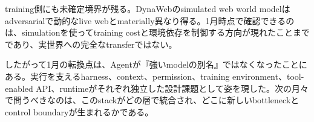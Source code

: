 \begin{claimboundary}
training側にも未確定境界が残る。DynaWebのsimulated web world modelはadversarialで動的なlive webとmaterially異なり得る。1月時点で確認できるのは、simulationを使ってtraining costと環境依存を制御する方向が現れたことまでであり、実世界への完全なtransferではない。\autocite{src-85bc3e4f7b39}
\end{claimboundary}

したがって1月の転換点は、Agentが『強いmodelの別名』ではなくなったことにある。実行を支えるharness、context、permission、training environment、tool-enabled API、runtimeがそれぞれ独立した設計課題として姿を現した。次の月々で問うべきなのは、このstackがどの層で統合され、どこに新しいbottleneckとcontrol boundaryが生まれるかである。\autocite{src-0d2abbb0fa62,src-3bc80a3c7870,src-85bc3e4f7b39,src-ae10eb4597fe,src-eac8dfbeb78c}
